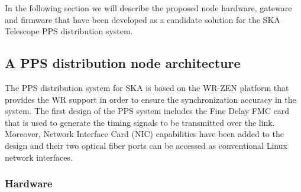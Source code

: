 In the following section we will describe the proposed node hardware, gateware and firmware that have been developed as a candidate solution for the SKA Telescope PPS distribution system. 

\subsection{A PPS distribution node architecture}


The PPS distribution system for SKA is based on the WR-ZEN platform that provides the WR support in order to ensure the synchronization accuracy in the system. The first design of the PPS system includes the Fine Delay FMC card that is used to generate the timing signals to be transmitted over the link. Moreover, Network Interface Card (NIC) capabilities have been added to the design and their two optical fiber ports can be accessed as conventional Linux network interfaces.

\subsubsection{Hardware}

%
%

